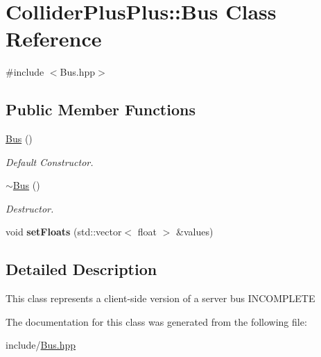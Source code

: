 \hypertarget{classColliderPlusPlus_1_1Bus}{\section{Collider\-Plus\-Plus\-:\-:Bus Class Reference}
\label{classColliderPlusPlus_1_1Bus}
}


{\ttfamily \#include $<$Bus.\-hpp$>$}

\subsection*{Public Member Functions}
\begin{DoxyCompactItemize}
\item 
\hypertarget{classColliderPlusPlus_1_1Bus_a2573707ab0adc378f8c4db656209c289}{\hyperlink{classColliderPlusPlus_1_1Bus_a2573707ab0adc378f8c4db656209c289}{Bus} ()}\label{classColliderPlusPlus_1_1Bus_a2573707ab0adc378f8c4db656209c289}

\begin{DoxyCompactList}\small\item\em Default Constructor. \end{DoxyCompactList}\item 
\hypertarget{classColliderPlusPlus_1_1Bus_a3940fb5fc3ab9d5b84c35fc1c9bd7ebe}{\hyperlink{classColliderPlusPlus_1_1Bus_a3940fb5fc3ab9d5b84c35fc1c9bd7ebe}{$\sim$\-Bus} ()}\label{classColliderPlusPlus_1_1Bus_a3940fb5fc3ab9d5b84c35fc1c9bd7ebe}

\begin{DoxyCompactList}\small\item\em Destructor. \end{DoxyCompactList}\item 
\hypertarget{classColliderPlusPlus_1_1Bus_ac461919afa50021b905c9e6c15099134}{void {\bfseries set\-Floats} (std\-::vector$<$ float $>$ \&values)}\label{classColliderPlusPlus_1_1Bus_ac461919afa50021b905c9e6c15099134}

\end{DoxyCompactItemize}


\subsection{Detailed Description}
This class represents a client-\/side version of a server bus I\-N\-C\-O\-M\-P\-L\-E\-T\-E 

The documentation for this class was generated from the following file\-:\begin{DoxyCompactItemize}
\item 
include/\hyperlink{Bus_8hpp}{Bus.\-hpp}\end{DoxyCompactItemize}
